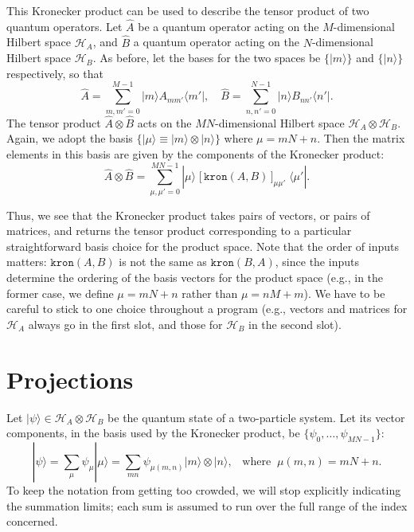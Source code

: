 \documentclass[pra,12pt]{revtex4}
\begin{document}
This Kronecker product can be used to describe the tensor product of
two quantum operators.  Let $\hat{A}$ be a quantum operator acting on
the $M$-dimensional Hilbert space $\mathscr{H}_A$, and $\hat{B}$ a
quantum operator acting on the $N$-dimensional Hilbert space
$\mathscr{H}_B$.  As before, let the bases for the two spaces be
$\{|m\rangle\}$ and $\{|n\rangle\}$ respectively, so that
$$\hat{A} = \sum_{m,m'=0}^{M-1}  |m\rangle A_{mm'} \langle m'|, \quad \hat{B} = \sum_{n,n'=0}^{N-1} |n\rangle B_{nn'}\langle n'|.$$
The tensor product $\hat{A}\otimes\hat{B}$ acts on the
$MN$-dimensional Hilbert space $\mathscr{H}_A\otimes \mathscr{H}_B$.
Again, we adopt the basis $\big\{|\mu\rangle \equiv |m\rangle\otimes
|n\rangle \big\}$ where $\mu = mN+n$.  Then the matrix elements in
this basis are given by the components of the Kronecker product:
$$\hat{A}\otimes\hat{B} = \sum_{\mu,\mu'=0}^{MN-1} |\mu\rangle \; \big[\,\texttt{kron}(A,B)\,\big]_{\mu\mu'} \; \langle\mu'|.$$

Thus, we see that the Kronecker product takes pairs of vectors, or
pairs of matrices, and returns the tensor product corresponding to a
particular straightforward basis choice for the product space.  Note
that the order of inputs matters: $\texttt{kron}(A,B)$ is not the same
as $\texttt{kron}(B,A)$, since the inputs determine the ordering of
the basis vectors for the product space (e.g., in the former case, we
define $\mu = mN+n$ rather than $\mu = nM+m$).  We have to be careful
to stick to one choice throughout a program (e.g., vectors and
matrices for $\mathscr{H}_A$ always go in the first slot, and those
for $\mathscr{H}_B$ in the second slot).

\section{Projections}

Let $|\psi\rangle \in \mathscr{H}_A\otimes \mathscr{H}_B$ be the quantum state
of a two-particle system.  Let its vector components, in the basis
used by the Kronecker product, be $\{\psi_0, \dots, \psi_{MN-1}\}$:
$$|\psi\rangle = \sum_{\mu} \psi_\mu |\mu\rangle = \sum_{mn} \psi_{\mu(m,n)} |m\rangle\otimes|n\rangle, \;\;\;\mathrm{where}\;\;\mu(m,n) = mN+n.$$
To keep the notation from getting too crowded, we will stop explicitly
indicating the summation limits; each sum is assumed to run over the
full range of the index concerned.
\end{document}
